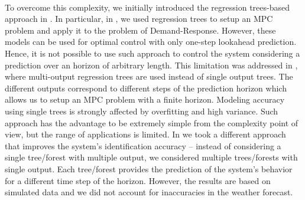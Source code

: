 {\\
To overcome this complexity, we initially introduced the regression trees-based approach in \cite{Behl2016,Jain2017TCPS}. 
In particular, in \cite{Behl2016}, we used regression trees to setup an MPC problem and apply it to the problem of Demand-Response. 
However, these models can be used for optimal control with only one-step lookahead prediction.
Hence, it is not possible to use such approach to control the system considering a prediction over an horizon of arbitrary length. 
This limitation was addressed in \cite{Jain2017TCPS}, where multi-output regression trees are used instead of single output trees. 
The different outputs correspond to different steps of the prediction horizon which allows us to setup an MPC problem with a finite horizon. 
Modeling accuracy using single trees is strongly affected by overfitting and high variance. 
Such approach has the advantage to be extremely simple from the complexity point of view, but the range of applications is limited. 
In \cite{JainACC2017,JainCDC2017} we took a different approach that improves the system's identification accuracy -- instead of considering a single tree/forest with multiple output, we considered multiple trees/forests with single output. 
Each tree/forest provides the prediction of the system's behavior for a different time step of the horizon. 
However, the results are based on simulated data and we did not account for inaccuracies in the weather forecast.
}





